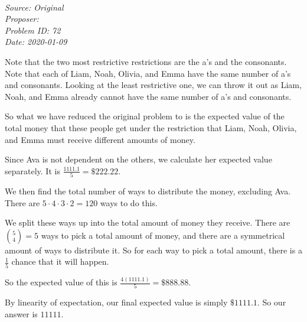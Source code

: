 \SSbreak\\
\emph{Source: Original}\\
\emph{Proposer: \Ppi}\\
\emph{Problem ID: 72}\\
\emph{Date: 2020-01-09}\\
\SSbreak

\bigskip

\begin{solution}\hfil\medskip
 
  Note that the two most restrictive restrictions are the a's and the consonants. Note that each of Liam, Noah, Olivia, and Emma have the same number of a's and consonants. Looking at the least restrictive one, we can throw it out as Liam, Noah, and Emma already cannot have the same number of a's and consonants. 

So what we have reduced the original problem to is the expected value of the total money that these people get under the restriction that Liam, Noah, Olivia, and Emma must receive different amounts of money. 

Since Ava is not dependent on the others, we calculate her expected value separately. It is $\frac{1111.1}{5}= \$222.22$.

We then find the total number of ways to distribute the money, excluding Ava. There are $5\cdot4\cdot3\cdot2 = 120$ ways to do this.

We split these ways up into the total amount of money they receive. There are $\binom{5}{4}=5$ ways to pick a total amount of money, and there are a symmetrical amount of ways to distribute it. So for each way to pick a total amount, there is a $\frac{1}{5}$ chance that it will happen.

So the expected value of this is $\frac{4(1111.1)}{5}=\$888.88$.

By linearity of expectation, our final expected value is simply $\$1111.1$. So our answer is $\boxed{11111}$.
 
\end{solution}\bigskip
